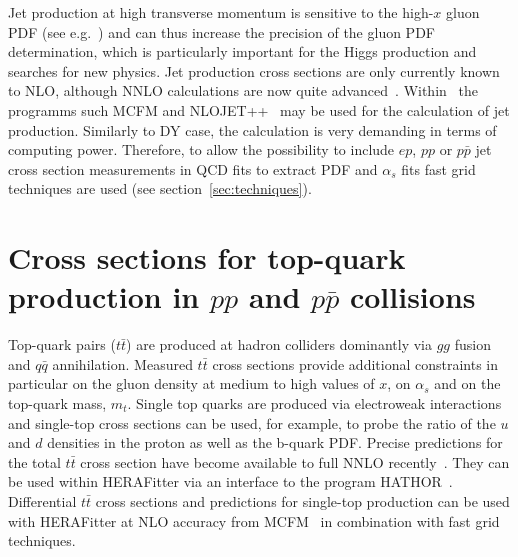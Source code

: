 Jet production at high transverse momentum is sensitive to the high-$x$ gluon 
PDF (see e.g.~\cite{MSTWpdf}) and can thus increase the precision of the 
gluon PDF determination, which is particularly important for the Higgs production and searches for new physics.
Jet production cross sections are only currently known to NLO, although NNLO 
calculations are now quite advanced~\cite{nigel:2013,nigel:2010}. 
Within \fitter\ the programms such MCFM and 
NLOJET++~\cite{Nagy:1998bb,Nagy:2001fj} may be used for the 
calculation of jet production.
Similarly to DY case, the calculation 
is very demanding in terms of computing power. 
Therefore, to allow the possibility to include  $ep$, $pp$ or $p\bar p$ 
jet cross section 
measurements in QCD fits to extract PDF and $\alpha_s$ fits fast 
grid techniques are used (see section~\ref{sec:techniques}).





\section{Cross sections for top-quark production in $pp$ and $p \bar p$ collisions}

Top-quark pairs ($t \bar t$) are produced at hadron colliders dominantly via $gg$ fusion 
and $q \bar q$ annihilation. Measured $t \bar t$ cross sections provide additional 
constraints in particular on the gluon density at medium to high values of $x$, 
on $\alpha_s$ and on the top-quark mass, $m_t$. 
Single top quarks are produced via electroweak interactions and single-top cross sections 
can be used, for example, to probe the ratio of the $u$ and $d$ densities in the proton 
as well as the b-quark PDF.
Precise predictions for the total $t \bar t$ cross section have become available 
to full NNLO recently~\cite{Czakon:2013goa}. They can be used within HERAFitter via an interface 
to the program HATHOR~\cite{Aliev:2010zk}. Differential $t \bar t$ cross sections and predictions 
for single-top production can be used with HERAFitter at NLO accuracy from 
MCFM~\cite{Campbell:2010ff,Campbell:2009ss,Campbell:2005bb,Campbell:2004ch,Campbell:2012uf} 
in combination with fast grid techniques.

